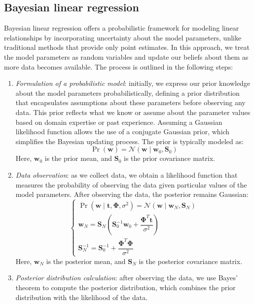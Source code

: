 \subsection{Bayesian linear regression}
Bayesian linear regression offers a probabilistic framework for modeling linear relationships by incorporating uncertainty about the model parameters, unlike traditional methods that provide only point estimates. 
In this approach, we treat the model parameters as random variables and update our beliefs about them as more data becomes available.
The process is outlined in the following steps:
\begin{enumerate}
    \item \textit{Formulation of a probabilistic model}: initially, we express our prior knowledge about the model parameters probabilistically, defining a prior distribution that encapsulates assumptions about these parameters before observing any data. 
        This prior reflects what we know or assume about the parameter values based on domain expertise or past experience.
        Assuming a Gaussian likelihood function allows the use of a conjugate Gaussian prior, which simplifies the Bayesian updating process. 
        The prior is typically modeled as:
        \[\Pr(\mathbf{w})=\mathcal{N}(\mathbf{w}\mid\mathbf{w}_0,\mathbf{S}_0)\]
        Here, $\mathbf{w}_0$ is the prior mean, and $\mathbf{S}_0$ is the prior covariance matrix.
    \item \textit{Data observation}: as we collect data, we obtain a likelihood function that measures the probability of observing the data given particular values of the model parameters.
        After observing the data, the posterior remains Gaussian:
        \[\begin{cases}
            \Pr(\mathbf{w}\mid\mathbf{t},\boldsymbol{\Phi},\sigma^2)=\mathcal{N}(\mathbf{w}\mid\mathbf{w}_N,\mathbf{S}_N) \\
            \mathbf{w}_N=\mathbf{S}_N\left(\mathbf{S}_0^{-1}\mathbf{w}_0+\dfrac{\boldsymbol{\Phi}^T\mathbf{t}}{\sigma^2}\right) \\
            \mathbf{S}_N^{-1}=\mathbf{S}_0^{-1}+\dfrac{\boldsymbol{\Phi}^T\boldsymbol{\Phi}}{\sigma^2}
        \end{cases}\]
        Here, $\mathbf{w}_N$ is the posterior mean, and $\mathbf{S}_N$ is the posterior covariance matrix.
    \item \textit{Posterior distribution calculation}: after observing the data, we use Bayes' theorem to compute the posterior distribution, which combines the prior distribution with the likelihood of the data.

\end{enumerate}
